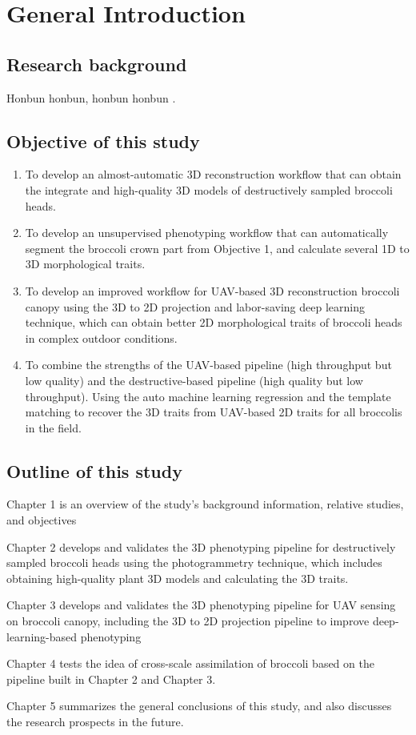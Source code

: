 \chapter{General Introduction}

\section{Research background}

Honbun honbun, honbun honbun \citep{guo_deep_2019, zhao_crop_2019}. 


\section{Objective of this study}

\begin{enumerate}
    \item To develop an almost-automatic 3D reconstruction workflow that can obtain the integrate and high-quality 3D models of destructively sampled broccoli heads.
    \item To develop an unsupervised phenotyping workflow that can automatically segment the broccoli crown part from Objective 1, and calculate several 1D to 3D morphological traits.
    \item To develop an improved workflow for UAV-based 3D reconstruction broccoli canopy using the 3D to 2D projection and labor-saving deep learning technique, which can obtain better 2D morphological traits of broccoli heads in complex outdoor conditions.
    \item To combine the strengths of the UAV-based pipeline (high throughput but low quality) and the destructive-based pipeline (high quality but low throughput). Using the auto machine learning regression and the template matching to recover the 3D traits from UAV-based 2D traits for all broccolis in the field.

\end{enumerate}


\section{Outline of this study}

Chapter 1 is an overview of the study's background information, relative studies, and objectives

Chapter 2 develops and validates the 3D phenotyping pipeline for destructively sampled broccoli heads using the photogrammetry technique, which includes obtaining high-quality plant 3D models and calculating the 3D traits.

Chapter 3 develops and validates the 3D phenotyping pipeline for UAV sensing on broccoli canopy, including the 3D to 2D projection pipeline to improve deep-learning-based phenotyping

Chapter 4 tests the idea of cross-scale assimilation of broccoli based on the pipeline built in Chapter 2 and Chapter 3.

Chapter 5 summarizes the general conclusions of this study, and also discusses the research prospects in the future.